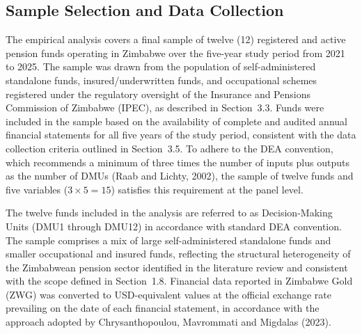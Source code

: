 \documentclass[12pt,a4paper]{article}
\begin{document}
\subsection{Sample Selection and Data Collection}

The empirical analysis covers a final sample of twelve (12) registered and active pension funds operating in Zimbabwe over the five-year study period from 2021 to 2025. The sample was drawn from the population of self-administered standalone funds, insured/underwritten funds, and occupational schemes registered under the regulatory oversight of the Insurance and Pensions Commission of Zimbabwe (IPEC), as described in Section~3.3. Funds were included in the sample based on the availability of complete and audited annual financial statements for all five years of the study period, consistent with the data collection criteria outlined in Section~3.5. To adhere to the DEA convention, which recommends a minimum of three times the number of inputs plus outputs as the number of DMUs (Raab and Lichty, 2002), the sample of twelve funds and five variables ($3 \times 5 = 15$) satisfies this requirement at the panel level.

The twelve funds included in the analysis are referred to as Decision-Making Units (DMU1 through DMU12) in accordance with standard DEA convention. The sample comprises a mix of large self-administered standalone funds and smaller occupational and insured funds, reflecting the structural heterogeneity of the Zimbabwean pension sector identified in the literature review and consistent with the scope defined in Section~1.8. Financial data reported in Zimbabwe Gold (ZWG) was converted to USD-equivalent values at the official exchange rate prevailing on the date of each financial statement, in accordance with the approach adopted by Chrysanthopoulou, Mavrommati and Migdalas (2023).
\end{document}
